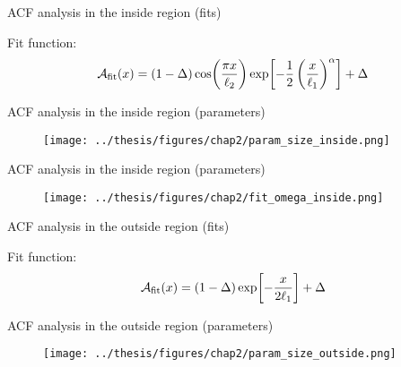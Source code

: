 \documentclass[aspectratio=169]{beamer}
\begin{document}
\begin{frame}{ACF analysis in the inside region (fits)}
  \hspace{-0.05\textwidth}
  \begin{minipage}{0.47 \textwidth}
    \centering
  \end{minipage}
  \hspace{0.01\textwidth}
  \begin{minipage}{0.50 \textwidth}
      Fit function:
      \[
        \mathcal{A}_{\rm fit}(x) = (1 - \Delta)\cos(\frac{\pi x}{\ell_2})\exp[-\frac{1}{2}\left(\frac{x}{\ell_1}\right)^\alpha] + \Delta
      \]
  \end{minipage}
\end{frame}

\begin{frame}{ACF analysis in the inside region (parameters)}
  \begin{figure}
      \centering
      \texttt{[image: ../thesis/figures/chap2/param\_size\_inside.png]}
  \end{figure}
\end{frame}

\begin{frame}{ACF analysis in the inside region (parameters)}
  \begin{figure}
      \centering
      \texttt{[image: ../thesis/figures/chap2/fit\_omega\_inside.png]}
  \end{figure}
\end{frame}

\begin{frame}{ACF analysis in the outside region (fits)}
  \hspace{-0.05\textwidth}
  \begin{minipage}{0.47 \textwidth}
    \centering
  \end{minipage}
  \hspace{0.01\textwidth}
  \begin{minipage}{0.50 \textwidth}
      Fit function:
      \[
        \mathcal{A}_{\rm fit}(x) = (1-\Delta)\exp[-\frac{x}{2\ell_1}] + \Delta
      \]
  \end{minipage}
\end{frame}

\begin{frame}{ACF analysis in the outside region (parameters)}
  \begin{figure}
    \centering
    \texttt{[image: ../thesis/figures/chap2/param\_size\_outside.png]}
  \end{figure}
\end{frame}
\end{document}
